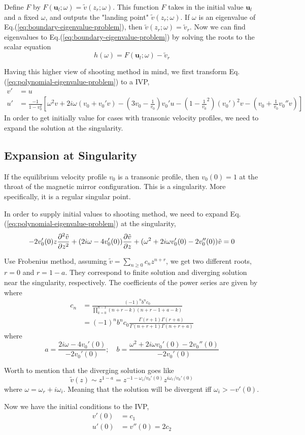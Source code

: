 Define $F$ by $F(\mathbf{u}_l;\omega)=\tilde{v}(z_r;\omega)$. This function $F$ takes in the initial value $\mathbf{u}_l$ and a fixed $\omega$, and outputs the "landing point" $\tilde{v}(z_r;\omega)$. If $\omega$ is an eigenvalue of Eq.(\ref{eq:boundary-eigenvalue-problem}), then $\tilde{v}(z_r;\omega) = \tilde{v}_r$. Now we can find eigenvalues to Eq.(\ref{eq:boundary-eigenvalue-problem}) by solving the roots to the scalar equation
\[h(\omega) = F(\mathbf{u}_l;\omega) - \tilde{v}_r\]

Having this higher view of shooting method in mind, we first transform Eq.(\ref{eq:polynomial-eigenvalue-problem}) to a IVP,
\begin{align*}
v' &= u\\
u' &= \frac{-1}{1-v_0^2}\left[
    \omega^2v + 2i\omega(v_0+v_0'v) - \left(3v_0 - \frac{1}{v_0}\right)v_0'u - \left(1-\frac{1}{v_0}^2\right)(v_0')^2v - \left(v_0+\frac{1}{v_0}v_0'' v\right)
\right]
\end{align*}
In order to get initially value for cases with transonic velocity profiles, we need to expand the solution at the singularity.

\subsection{Expansion at Singularity}
If the equilibrium velocity profile $v_0$ is a transonic profile, then $v_0(0) = 1$ at the throat of the magnetic mirror configuration. This is a singularity. More specifically, it is a regular singular point. 

In order to supply initial values to shooting method, we need to expand Eq.(\ref{eq:polynomial-eigenvalue-problem}) at the singularity, 
\[ - 2v_0'(0)z\pdv[2]{\tilde{v}}{z}
+ (2i\omega - 4v_0'(0))\pdv{\tilde{v}}{z} 
+ (\omega^2 + 2i\omega v_0'(0) - 2v_0''(0))\tilde{v}
= 0 \]


Use Frobenius method, assuming $\tilde{v} = \sum_{n\geq 0}c_nz^{n+r}$, we get two different roots, $r=0$ and $r=1-a$. They correspond to finite solution and diverging solution near the singularity, respectively. The coefficients of the power series are given by 
where 
\begin{align*}    
  c_n &= \frac{(-1)^n b^n c_0}{\prod_{k=0}^{n-1} (n+r-k)(n+r-1+a-k)} \\
      &= (-1)^n b^n c_0 \frac{\Gamma(r+1)\Gamma(r+a)}{\Gamma(n+r+1)\Gamma(n+r+a)}
\end{align*}
where
\[ a = \frac{2i\omega - 4v_0'(0)}{-2v_0'(0)}; \quad 
  b = \frac{\omega^2 + 2i\omega v_0'(0) - 2v_0''(0)}{-2v_0'(0)}
\]

Worth to mention that the diverging solution goes like 
\[ 
\tilde{v}(z) \sim z^{1-a} = z^{-1-\omega_i/v_0'(0)}z^{i\omega_r/v_0'(0)}  \]
where $\omega = \omega_r + i\omega_i$. Meaning that the solution will be divergent iff $\omega_i > -v'(0)$.

Now we have the initial conditions to the IVP,
\begin{align*}
  v'(0) &= c_1 \\
  u'(0) &= v''(0) = 2c_2
\end{align*}
